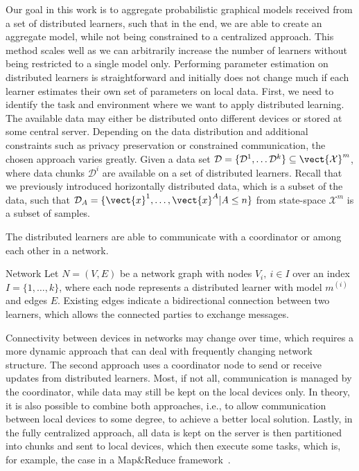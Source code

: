 Our goal in this work is to aggregate probabilistic graphical models received from a set of distributed learners, such that in the end, we are able to create an aggregate model, while not being constrained to a centralized approach.
This method scales well as we can arbitrarily increase the number of learners without being restricted to a single model only.
Performing parameter estimation on distributed learners is straightforward and initially does not change much if each learner estimates their own set of parameters on local data.
First, we need to identify the task and environment where we want to apply distributed learning.
The available data may either be distributed onto different devices or stored at some central server.
Depending on the data distribution and additional constraints such as privacy preservation or constrained communication, the chosen approach varies greatly.
Given a data set $\mathcal{D} = \{\mathcal{D}^1, \ldots \mathcal{D}^k\} \subseteq \vect{\mathcal{X}}^m$,
where data chunks $\mathcal{D}^i$ are available on a set of distributed learners.
Recall that we previously introduced horizontally distributed data, which is a subset of the data, such that $\mathcal{D}_{A} = \{\vect{x}^1, \ldots, \vect{x}^A \lvert A \leq n\}$ from state-space $\mathcal{X}^m$ is a subset of samples.

The distributed learners are able to communicate with a coordinator or among each other in a network.

\begin{definition}{Network}
    Let $N = (V, E)$ be a network graph with nodes $V_i, \: i \in I$ over an index $I=\{1,\ldots,k\}$, where each node represents a distributed learner with model $m^{(i)}$ and edges $E$. 
    Existing edges indicate a bidirectional connection between two learners, which allows the connected parties to exchange messages.
\end{definition}

Connectivity between devices in networks may change over time, which requires a more dynamic approach that can deal with frequently changing network structure.
The second approach uses a coordinator node to send or receive updates from distributed learners. 
Most, if not all, communication is managed by the coordinator, while data may still be kept on the local devices only.
In theory, it is also possible to combine both approaches, i.e., to allow communication between local devices to some degree, to achieve a better local solution.
Lastly, in the fully centralized approach, all data is kept on the server is then partitioned into chunks and sent to local devices, which then execute some tasks, which is, for example, the case in a Map\&Reduce framework~\cite{dean2010mapreduce}.

